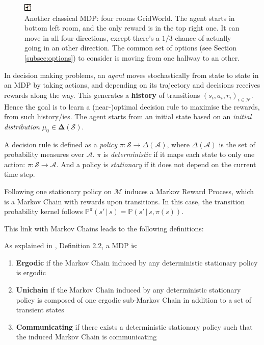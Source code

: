 \begin{figure}[htb]
\centering
\includegraphics[width=0.3\linewidth, keepaspectratio]{four_rooms.png}
\decoRule
\caption{Another classical MDP: four rooms GridWorld. The agent starts in bottom left room, and the only reward is in the top right one. It can move in all four directions, except there's a $1/3$ chance of actually going in an other direction. The common set of options (see Section \ref{subsec:options}) to consider is moving from one hallway to an other.}
\label{fig:4rooms}
\end{figure}


In decision making problems, an \emph{agent} moves stochastically from state to state in an MDP by taking actions, and depending on its trajectory and decisions receives rewards along the way. This generates a \textbf{history} of transitions $(s_i, a_i, r_i)_{i \in \mathcal{N}}$. Hence the goal is to learn a (near-)optimal decision rule to maximise the rewards, from such history/ies. The agent starts from an initial state based on an \emph{initial distribution} $\mu_0 \in \mathbf{\Delta}(\mathcal{S})$.

A decision rule is defined as a \emph{policy} $\pi : \mathcal{S} \to \Delta(\mathcal{A})$, where $\Delta(\mathcal{A})$ is the set of probability measures over $\mathcal{A}$. $\pi$ is \emph{deterministic} if it maps each state to only one action: $\pi : \mathcal{S} \to \mathcal{A}$. And a policy is \emph{stationary} if it does not depend on the current time step.

Following one stationary policy on $\mathcal{M}$ induces a Markov Reward Process, which is a Markov Chain with rewards upon transitions. In this case, the transition probability kernel follows $\mathbb{P}^\pi(s' \,|\, s) = \mathbb{P}(s' \,|\, s, \pi(s))$.

This link with Markov Chains leads to the following definitions:

\begin{defi}
  As explained in \citep{fruit_thesis_2019}, Definition 2.2,  a MDP is:
  \begin{enumerate}
  \item \textbf{Ergodic} if the Markov Chain induced by any deterministic stationary policy is ergodic
  \item \textbf{Unichain} if the Markov Chain induced by any deterministic stationary policy is composed of one ergodic sub-Markov Chain in addition to a set of transient states
  \item \textbf{Communicating} if there exists a deterministic stationary policy such that the induced Markov Chain is communicating
  \end{enumerate}
\end{defi}

